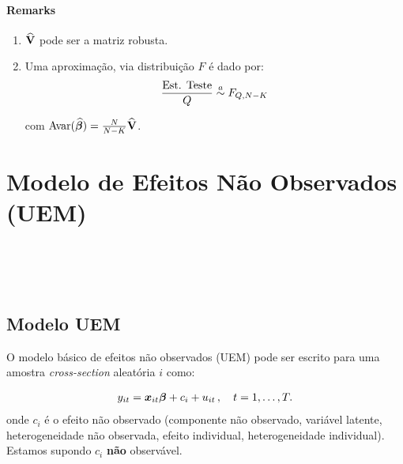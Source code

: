 \documentclass[11pt, oneside, a4paper, article]{article}
\numberwithin{equation}{section}
\begin{document}
\paragraph{Remarks}
\begin{enumerate}
	\item $\widehat{\mathbf{V}}$ pode ser a matriz robusta.

	\item Uma aproximação, via distribuição $F$ é dado por:
		\begin{align*}
			\frac{\text{Est. Teste}}{Q} \overset{a}{\sim} F_{Q, N-K}
		\end{align*}

		\noindent
		com $\text{Avar}(\widehat{\boldsymbol{\beta}}) = \frac{N}{N-K} \widehat{\mathbf{V}}$.
\end{enumerate}


\clearpage
\section{Modelo de Efeitos Não Observados (UEM)}
\noindent
\citet[C.10 -- Basic Linear Unobserved Effects Panel Data Models, p.247--291]{wool-2010} \\
\citet[Sec.10.1 -- Motivation: The Omitted Variables Problem, p.247]{wool-2010}\\
\citet[Sec.10.2 -- Assumptions about the Unobserved Effects and Explanatory Variables, p.251]{wool-2010}\\
\citet[Sec.10.3 -- Estimating UEM by POLS, p.256]{wool-2010}

\subsection{Modelo UEM}

O modelo básico de efeitos não observados (UEM) pode ser escrito para uma amostra \textit{cross-section} aleatória $i$ como:

\vspace{-1 em}
\begin{align}\label{uem:mod:1}
	y_{it} = \boldsymbol{x}_{it} \boldsymbol{\beta} + c_{i} + u_{it} \, , \quad t=1,\dots, T.
\end{align}
onde $c_{i}$ é o efeito não observado (componente não observado, variável latente, heterogeneidade não observada, efeito individual, heterogeneidade individual).
Estamos supondo $c_{i}$ \textbf{não} observável.
\end{document}
